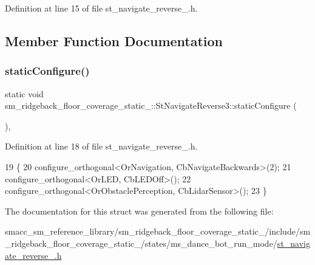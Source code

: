 Definition at line 15 of file st\+\_\+navigate\+\_\+reverse\+\_.\+h.



\subsection{Member Function Documentation}
\mbox{\label{structsm__ridgeback__floor__coverage__static__1_1_1StNavigateReverse3_a9eb3b774beb0ba424fdd05a50b5c005a}} 
\subsubsection{\texorpdfstring{static\+Configure()}{staticConfigure()}}
{\footnotesize\ttfamily static void sm\+\_\+ridgeback\+\_\+floor\+\_\+coverage\+\_\+static\+\_\+::\+St\+Navigate\+Reverse3\+::static\+Configure (\begin{DoxyParamCaption}{ }\end{DoxyParamCaption})\hspace{0.3cm}{\ttfamily [inline]}, {\ttfamily [static]}}



Definition at line 18 of file st\+\_\+navigate\+\_\+reverse\+\_.\+h.


\begin{DoxyCode}
19    \{
20       configure\_orthogonal<OrNavigation, CbNavigateBackwards>(2);
21       configure\_orthogonal<OrLED, CbLEDOff>();
22       configure\_orthogonal<OrObstaclePerception, CbLidarSensor>();
23    \}
\end{DoxyCode}


The documentation for this struct was generated from the following file\+:\begin{DoxyCompactItemize}
\item 
smacc\+\_\+sm\+\_\+reference\+\_\+library/sm\+\_\+ridgeback\+\_\+floor\+\_\+coverage\+\_\+static\+\_/include/sm\+\_\+ridgeback\+\_\+floor\+\_\+coverage\+\_\+static\+\_/states/ms\+\_\+dance\+\_\+bot\+\_\+run\+\_\+mode/\hyperlink{sm__ridgeback__floor__coverage__static__1_2include_2sm__ridgeback__floor__coverage__static__1_2s0f6d49f89d76935ff0e0654155fc4706}{st\+\_\+navigate\+\_\+reverse\+\_.\+h}\end{DoxyCompactItemize}
